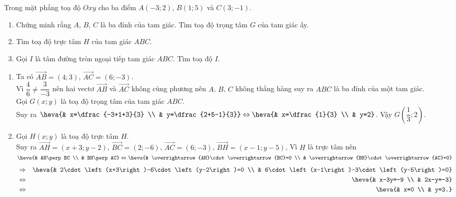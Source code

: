 \begin{bt}%
	Trong mặt phẳng toạ độ $Oxy$ cho ba điểm $A(-3;2)$, $B(1;5)$ và $C(3;-1)$.
	\begin{enumerate}
		\item Chứng minh rằng $A$, $B$, $C$ là ba đỉnh của tam giác. Tìm toạ độ trọng tâm $G$ của tam giác ấy.
		\item Tìm toạ độ trực tâm $H$ của tam giác $ABC$.
		\item Gọi $I$ là tâm đường tròn ngoại tiếp tam giác $ABC$. Tìm toạ độ $I$.
	\end{enumerate}
	\loigiai
	{
		\begin{enumerate}
			\item Ta có $\overrightarrow{AB}=\left(4;3\right)$, $\overrightarrow{AC}=\left(6;-3\right)$.\\
			Vì $\dfrac{4}{6}\ne\dfrac{3}{-3}$ nên hai vectơ $\overrightarrow{AB}$ và $\overrightarrow{AC}$ không cùng phương nên $A$, $B$, $C$ không thẳng hàng suy ra $ABC$ là ba đỉnh của một tam giác.\\
			Gọi $G\left(x;y\right)$ là toạ độ trọng tâm của tam giác $ABC$.\\
			Suy ra $\heva{& x=\dfrac{-3+1+3}{3} \\ & y=\dfrac{2+5-1}{3}}\Leftrightarrow\heva{& x=\dfrac{1}{3} \\ & y=2}$. Vậy $G\left(\dfrac{1}{3};2\right)$.
			\item Gọi $H\left(x;y\right)$ là toạ độ trực tâm $H$.\\
			Suy ra $\overrightarrow{AH}=\left(x+3;y-2\right)$, $\overrightarrow{BC}=\left(2;-6\right)$, $\overrightarrow{AC}=\left(6;-3\right)$, $\overrightarrow{BH}=\left(x-1;y-5\right)$, 
			Vì $H$ là trực tâm nên $\heva{& AH\perp BC \\ & BH\perp AC}\Leftrightarrow\heva{& \overrightarrow{AH}\cdot\overrightarrow{BC}=0 \\ & \overrightarrow{BH}\cdot\overrightarrow{AC}=0}$ \allowdisplaybreaks
			\begin{eqnarray*}
				&\Rightarrow&\heva{& 2\cdot\left(x+3\right)-6\cdot\left(y-2\right)=0 \\ & 6\cdot\left(x-1\right)-3\cdot\left(y-5\right)=0}\\
				&\Leftrightarrow&\heva{& x-3y=-9 \\ & 2x-y=-3}\\
				&\Leftrightarrow&\heva{& x=0 \\ & y=3.}
			\end{eqnarray*}

\end{enumerate}}
\end{bt}
